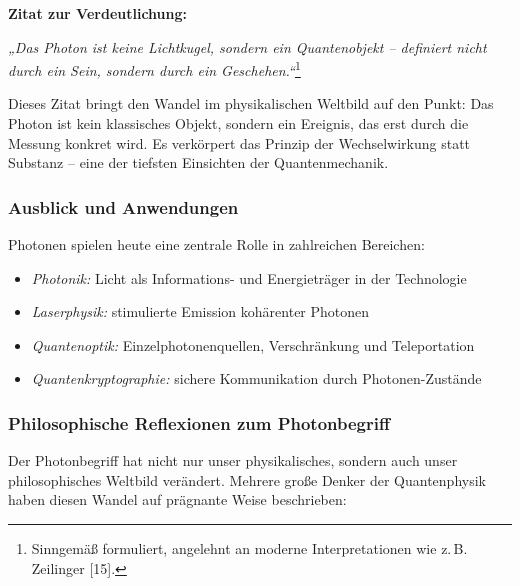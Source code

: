 \vspace{0.5em}

\textbf{Zitat zur Verdeutlichung:}
\vspace{1em}
\begin{tcolorbox}[colback=yellow!10!white, colframe=yellow!50!black, title=Quantenobjekt statt Lichtkugel]
	\label{box:lichtkugel}
	\emph{„Das Photon ist keine Lichtkugel, sondern ein Quantenobjekt – definiert nicht durch ein Sein, sondern durch ein Geschehen.“}\footnote{Sinngemäß formuliert, angelehnt an moderne Interpretationen wie z.\,B. Zeilinger [15].}
	
	\vspace{0.5em}
	Dieses Zitat bringt den Wandel im physikalischen Weltbild auf den Punkt: Das Photon ist kein klassisches Objekt, sondern ein Ereignis, das erst durch die Messung konkret wird. Es verkörpert das Prinzip der Wechselwirkung statt Substanz – eine der tiefsten Einsichten der Quantenmechanik.
\end{tcolorbox}

\subsubsection{Ausblick und Anwendungen}

Photonen spielen heute eine zentrale Rolle in zahlreichen Bereichen:
\begin{itemize}
	\item \emph{Photonik:} Licht als Informations- und Energieträger in der Technologie
	\item \emph{Laserphysik:} stimulierte Emission kohärenter Photonen
	\item \emph{Quantenoptik:} Einzelphotonenquellen, Verschränkung und Teleportation
	\item \emph{Quantenkryptographie:} sichere Kommunikation durch Photonen-Zustände
\end{itemize}

\subsubsection{Philosophische Reflexionen zum Photonbegriff}

Der Photonbegriff hat nicht nur unser physikalisches, sondern auch unser philosophisches Weltbild verändert. Mehrere große Denker der Quantenphysik haben diesen Wandel auf prägnante Weise beschrieben:

